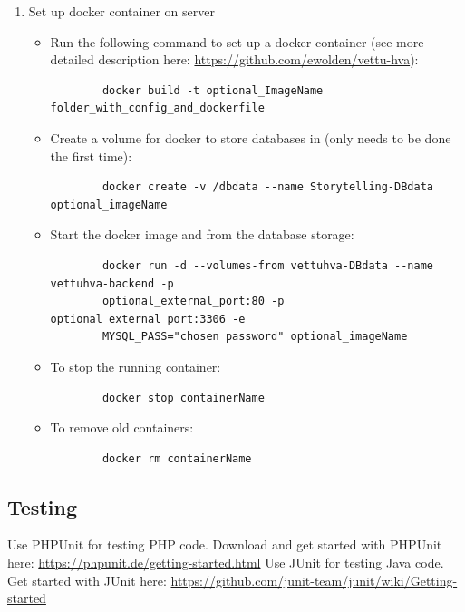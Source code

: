 \begin{appendices}
\begin{enumerate}
	\item Set up docker container on server
	\begin{itemize}
		\item Run the following command to set up a docker container (see more detailed description here: \url{https://github.com/ewolden/vettu-hva}):
		\begin{verbatim}
		docker build -t optional_ImageName folder_with_config_and_dockerfile
		\end{verbatim}
		\item Create a volume for docker to store databases in (only needs to be done the first time):
		\begin{verbatim}
		docker create -v /dbdata --name Storytelling-DBdata optional_imageName
		\end{verbatim}
		\item Start the docker image and from the database storage:
		\begin{verbatim}
		docker run -d --volumes-from vettuhva-DBdata --name vettuhva-backend -p 
		optional_external_port:80 -p optional_external_port:3306 -e 
		MYSQL_PASS="chosen password" optional_imageName
		\end{verbatim}
		\item To stop the running container:
		\begin{verbatim}
		docker stop containerName
		\end{verbatim}
		\item To remove old containers:
		\begin{verbatim}
		docker rm containerName
		\end{verbatim}
	\end{itemize}
\end{enumerate}

\subsection{Testing} 	
Use PHPUnit for testing PHP code. Download and get started with PHPUnit here:  \url{https://phpunit.de/getting-started.html} \newline
Use JUnit for testing Java code. Get started with JUnit here: \url{https://github.com/junit-team/junit/wiki/Getting-started}

\end{appendices}
